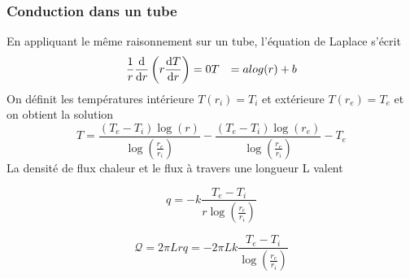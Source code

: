 \documentclass[a4paper,11pt]{report}
\newcommand{\recip}[1]{\frac{1}{#1}}
\begin{document}
      \subsubsection{Conduction dans un tube}
        En appliquant le même raisonnement sur un tube, l'équation de Laplace s'écrit
        \begin{equation}
          \begin{aligned}
            \recip{r}\dv{r}\left(r\dv{T}{r}\right) &= 0
            T &= a log(r) + b
          \end{aligned}
        \end{equation}
        On définit les températures intérieure $T(r_i)= T_i$ et extérieure $T(r_e) = T_e$ et on obtient la solution
        \begin{equation}
          T = \frac{(T_e - T_i) \log(r)}{\log\left(\frac{r_e}{r_i}\right)} - \frac{(T_e - T_i) \log(r_e)}{\log\left(\frac{r_e}{r_i}\right)} - T_e
        \end{equation}
        La densité de flux chaleur et le flux à travers une longueur L valent
        \begin{multicols}{2}
          \begin{equation}
            q = -k \frac{T_e - T_i}{r\log\left(\frac{r_e}{r_i}\right)} \nonumber
          \end{equation}

          \begin{equation}
            \mathcal{Q} = 2\pi Lrq = -2\pi L k \frac{T_e - T_i}{\log\left(\frac{r_e}{r_i}\right)}
          \end{equation}
        \end{multicols}



\begin{appendix}
  
\end{appendix}
\end{document}
